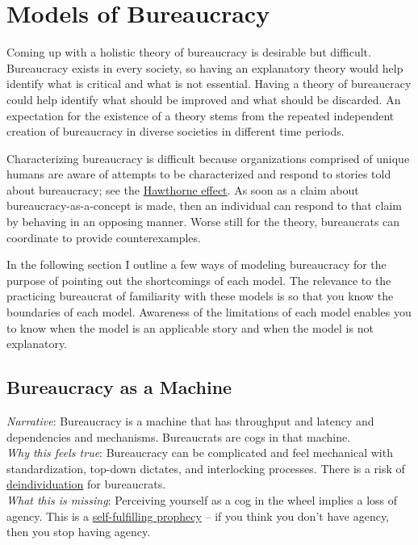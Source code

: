 \section{Models of Bureaucracy\label{sec:models-of-bureaucracy}}

Coming up with a holistic theory of bureaucracy is desirable but difficult. Bureaucracy exists in every society, so having an explanatory theory would help identify what is critical and what is not essential. Having a theory of bureaucracy could help identify what should be improved and what should be discarded. An expectation for the existence of a theory stems from the repeated independent creation of bureaucracy in diverse societies in different time periods. 

Characterizing bureaucracy is difficult because organizations comprised of unique humans are aware of attempts to be characterized and respond to stories told about bureaucracy; see the \href{https://en.wikipedia.org/wiki/Hawthorne_effect}{Hawthorne effect}. As soon as a claim about bureaucracy-as-a-concept is made, then an individual can respond to that claim by behaving in an opposing manner. Worse still for the theory, bureaucrats can coordinate to provide counterexamples. 

In the following section I outline a few ways of modeling bureaucracy for the purpose of pointing out the shortcomings of each model. The relevance to the practicing bureaucrat of familiarity with these models is so that you know the boundaries of each model. Awareness of the limitations of each model enables you to know when the model is an applicable story and when the model is not explanatory. 

\subsection*{Bureaucracy as a Machine}

\textit{Narrative}: Bureaucracy is a machine that has throughput and latency and dependencies and mechanisms. Bureaucrats are cogs in that machine.\\
\textit{Why this feels true}: Bureaucracy can be complicated and feel mechanical with standardization, top-down dictates, and interlocking processes. There is a risk of \href{https://en.wikipedia.org/wiki/Deindividuation}{deindividuation} for bureaucrats. \\
\textit{What this is missing}: Perceiving yourself as a cog in the wheel implies a loss of agency. This is a \href{https://en.wikipedia.org/wiki/Self-fulfilling_prophecy}{self-fulfilling prophecy} -- if you think you don't have agency, then you stop having agency. 

